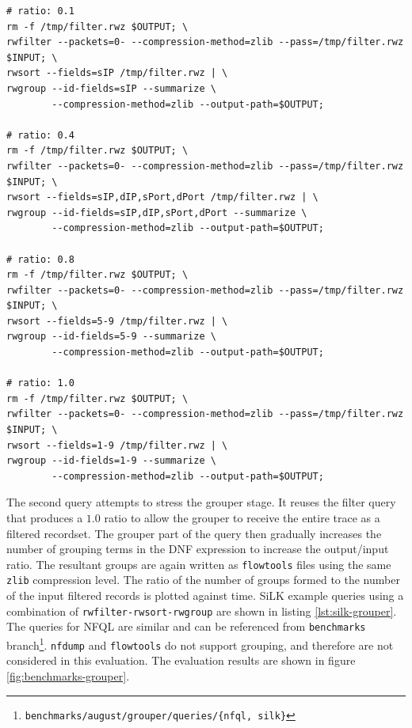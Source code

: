 \begin{lstlisting}
# ratio: 0.1
rm -f /tmp/filter.rwz $OUTPUT; \
rwfilter --packets=0- --compression-method=zlib --pass=/tmp/filter.rwz $INPUT; \
rwsort --fields=sIP /tmp/filter.rwz | \
rwgroup --id-fields=sIP --summarize \
        --compression-method=zlib --output-path=$OUTPUT;

# ratio: 0.4
rm -f /tmp/filter.rwz $OUTPUT; \
rwfilter --packets=0- --compression-method=zlib --pass=/tmp/filter.rwz $INPUT; \
rwsort --fields=sIP,dIP,sPort,dPort /tmp/filter.rwz | \
rwgroup --id-fields=sIP,dIP,sPort,dPort --summarize \
        --compression-method=zlib --output-path=$OUTPUT;

# ratio: 0.8
rm -f /tmp/filter.rwz $OUTPUT; \
rwfilter --packets=0- --compression-method=zlib --pass=/tmp/filter.rwz $INPUT; \
rwsort --fields=5-9 /tmp/filter.rwz | \
rwgroup --id-fields=5-9 --summarize \
        --compression-method=zlib --output-path=$OUTPUT;

# ratio: 1.0
rm -f /tmp/filter.rwz $OUTPUT; \
rwfilter --packets=0- --compression-method=zlib --pass=/tmp/filter.rwz $INPUT; \
rwsort --fields=1-9 /tmp/filter.rwz | \
rwgroup --id-fields=1-9 --summarize \
        --compression-method=zlib --output-path=$OUTPUT;
\end{lstlisting}

The second query attempts to stress the grouper stage. It reuses the filter
query that produces a $1.0$ ratio to allow the grouper to receive the entire
trace as a filtered recordset. The grouper part of the query then gradually
increases the number of grouping terms in the \ac{DNF} expression to increase
the output/input ratio. The resultant groups 
are again written as \texttt{flowtools} files using the same \texttt{zlib}
compression level. The ratio of the number of groups formed to the number of
the input filtered records is plotted against time. SiLK example queries using
a combination of \texttt{rwfilter-rwsort-rwgroup} are shown in listing
\ref{lst:silk-grouper}.  The queries for \ac{NFQL} are similar and can be
referenced from \texttt{benchmarks}
branch\footnote{\texttt{benchmarks/august/grouper/queries/\{nfql, silk\}}}.
\texttt{nfdump} and \texttt{flowtools} do not support grouping, and therefore
are not considered in this evaluation. The evaluation results are shown in
figure \ref{fig:benchmarks-grouper}.

